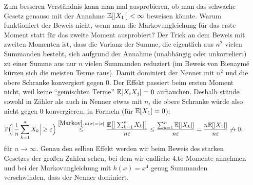 	Zum besseren Verst\"andnis kann man mal ausprobieren, ob man das schwache Gesetz genauso mit der Annahme $\mathbb{E}[|X_1|]<\infty$ beweisen k\"onnte. Warum funktioniert der Beweis nicht, wenn man die Markovungleichung f\"ur das erste Moment statt f\"ur das zweite Moment ausprobiert? Der Trick an dem Beweis mit zweiten Momenten ist, dass die Varianz der Summe, die eigentlich aus $n^2$ vielen Summanden besteht, sich aufgrund der Annahme (unabh\"angig oder unkorreliert) zu einer Summe aus nur $n$ vielen Summanden reduziert (im Beweis von Bienaym\'e k\"urzen sich die meisten Terme raus). Damit dominiert der Nenner mit $n^2$ und die obere Schranke konvergiert gegen $0$. Der Effekt passiert beim ersten Moment nicht, weil keine \enquote{gemischten Terme} $\mathbb{E}[X_iX_j]=0$ auftauchen. Deshalb st\"unde sowohl in Z\"ahler als auch in Nenner etwas mit $n$, die obere Schranke w\"urde also nicht gegen $0$ konvergieren, in Formeln (f\"ur $\mathbb{E}[X_1]=0$):
	\begin{align*}
		\mathbb{P}\Big(\Big|\frac{1}{n} \sum\limits_{k=1}^{n} X_k\Big| \geq \varepsilon\Big)
		&\overset{\ref{Markov},\, h(x)=|x|}{\leq} \frac{\mathbb{E} \big[\big|\sum_{k=1}^n X_k\big|\big] }{n\varepsilon}\leq \frac{\sum_{k=1}^n \mathbb{E}[|X_k|]}{n\varepsilon}= \frac{n\mathbb{E}[|X_1|]}{n\varepsilon} \not\to 0,
	\end{align*}
	f\"ur $n\to\infty$. Genau den selben Effekt werden wir beim Beweis des starken Gesetzes der gro\ss en Zahlen sehen, bei dem wir endliche 4.te Momente annehmen und bei der Markovungleichung mit $h(x)=x^4$ genug Summanden verschwinden, dass der Nenner dominiert.
	
	

